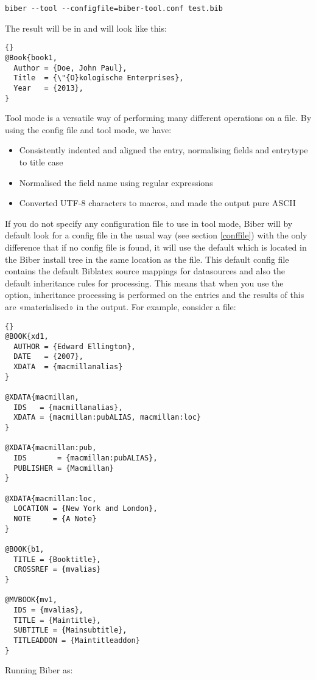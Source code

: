 \documentclass{ltxdockit}
\newcommand*{\biber}{Biber\xspace}
\newcommand*{\biblatex}{Biblatex\xspace}
\begin{document}
\begin{verbatim}
biber --tool --configfile=biber-tool.conf test.bib
\end{verbatim}
%
The result will be in  and will look like this:

\begin{lstlisting}[style=bibtex, columns=fixed]{}
@Book{book1,
  Author = {Doe, John Paul},
  Title  = {\"{O}kologische Enterprises},
  Year   = {2013},
}
\end{lstlisting}
%
Tool mode is a versatile way of performing many different operations
on a  file. By using the config file and tool mode, we
have:

\begin{itemize}
\item Consistently indented and aligned the entry, normalising fields and
  entrytype to title case
\item Normalised the  field name using regular expressions
\item Converted UTF-8 characters to \latex macros, and made the output
  pure ASCII
\end{itemize}

If you do not specify any configuration file to use in tool mode, \biber
will by default look for a config file in the usual way (see section
\ref{conffile}) with the only difference that if no config file is found,
it will use the default  which is located in the
\biber install tree in the same location as the  file. This
default config file contains the default \biblatex source mappings for
\bibtex datasources and also the default inheritance rules for
 processing. This means that when you use the
 option, inheritance processing is performed on the
entries and the results of this are «materialised» in the output. For
example, consider a  file:

\begin{lstlisting}[style=bibtex, columns=fixed]{}
@BOOK{xd1,
  AUTHOR = {Edward Ellington},
  DATE   = {2007},
  XDATA  = {macmillanalias}
}

@XDATA{macmillan,
  IDS   = {macmillanalias},
  XDATA = {macmillan:pubALIAS, macmillan:loc}
}

@XDATA{macmillan:pub,
  IDS       = {macmillan:pubALIAS},
  PUBLISHER = {Macmillan}
}

@XDATA{macmillan:loc,
  LOCATION = {New York and London},
  NOTE     = {A Note} 
}

@BOOK{b1,
  TITLE = {Booktitle},
  CROSSREF = {mvalias}
}

@MVBOOK{mv1,
  IDS = {mvalias},
  TITLE = {Maintitle},
  SUBTITLE = {Mainsubtitle},
  TITLEADDON = {Maintitleaddon}
}
\end{lstlisting}
%
Running \biber as:
\end{document}

